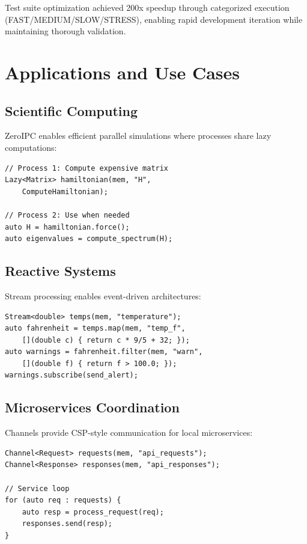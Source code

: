 \documentclass[10pt,conference]{IEEEtran}
\begin{document}
Test suite optimization achieved 200x speedup through categorized execution (FAST/MEDIUM/SLOW/STRESS), enabling rapid development iteration while maintaining thorough validation.

\section{Applications and Use Cases}

\subsection{Scientific Computing}

ZeroIPC enables efficient parallel simulations where processes share lazy computations:

\begin{lstlisting}[caption={Parallel Simulation},label={lst:simulation}]
// Process 1: Compute expensive matrix
Lazy<Matrix> hamiltonian(mem, "H", 
    ComputeHamiltonian);

// Process 2: Use when needed
auto H = hamiltonian.force();
auto eigenvalues = compute_spectrum(H);
\end{lstlisting}

\subsection{Reactive Systems}

Stream processing enables event-driven architectures:

\begin{lstlisting}[caption={Sensor Processing Pipeline},label={lst:sensor}]
Stream<double> temps(mem, "temperature");
auto fahrenheit = temps.map(mem, "temp_f",
    [](double c) { return c * 9/5 + 32; });
auto warnings = fahrenheit.filter(mem, "warn",
    [](double f) { return f > 100.0; });
warnings.subscribe(send_alert);
\end{lstlisting}

\subsection{Microservices Coordination}

Channels provide CSP-style communication for local microservices:

\begin{lstlisting}[caption={Service Coordination},label={lst:microservice}]
Channel<Request> requests(mem, "api_requests");
Channel<Response> responses(mem, "api_responses");

// Service loop
for (auto req : requests) {
    auto resp = process_request(req);
    responses.send(resp);
}
\end{lstlisting}
\end{document}
